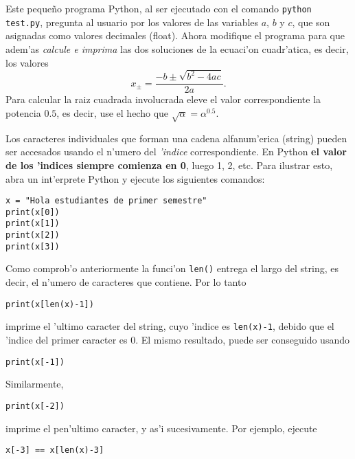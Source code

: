 \documentclass[11pt]{exam}
\begin{document}
\begin{questions}
\begin{itemize}
Este pequeño programa Python, al ser ejecutado con el comando \texttt{python test.py}, pregunta al usuario por los valores de las variables $a$, $b$ y $c$, que son asignadas como valores decimales (float). Ahora modifique el programa para que adem'as \textit{calcule e imprima} las dos soluciones de la ecuaci'on cuadr'atica, es decir, los valores 
\begin{equation}
x_\pm=\frac{-b\pm\sqrt{b^2-4ac}}{2a}.
\end{equation}
Para calcular la raiz cuadrada involucrada eleve el valor correspondiente la potencia $0.5$, es decir, use el hecho que $\sqrt{\alpha}=\alpha^{0.5}$.
\end{itemize}

\item Los caracteres individuales que forman una cadena alfanum'erica (string) pueden ser accesados usando el n'umero del \textit{'indice} correspondiente. En Python \textbf{el valor de los 'indices siempre comienza en 0}, luego 1, 2, etc. Para ilustrar esto, abra un int'erprete Python y ejecute los siguientes comandos:

\begin{verbatim}
x = "Hola estudiantes de primer semestre"
print(x[0])
print(x[1])
print(x[2])
print(x[3])
\end{verbatim}

\item Como comprob'o anteriormente la funci'on \texttt{len()} entrega el largo del string, es decir, el n'umero de caracteres que contiene. Por lo tanto

\begin{verbatim}
print(x[len(x)-1])
\end{verbatim}

imprime el 'ultimo caracter del string, cuyo 'indice es \texttt{len(x)-1}, debido que el 'indice del primer caracter es 0. El mismo resultado, puede ser conseguido usando

\begin{verbatim}
print(x[-1])
\end{verbatim}

Similarmente,

\begin{verbatim}
print(x[-2])
\end{verbatim}

imprime el pen'ultimo caracter, y as'i sucesivamente. Por ejemplo, ejecute

\begin{verbatim}
x[-3] == x[len(x)-3]
\end{verbatim}


\end{questions}
\end{document}
